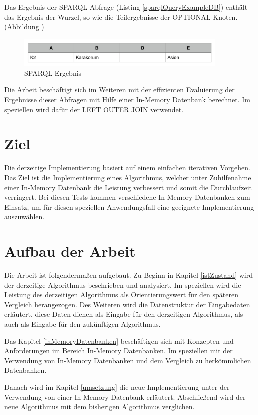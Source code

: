 \documentclass[draft,final]{vutinfth} %
\begin{document}
Das Ergebnis der SPARQL Abfrage (Listing \ref{sparqlQueryExampleDB}) enthält das Ergebnis der Wurzel, so wie die Teilergebnisse der OPTIONAL Knoten. (Abbildung )

\begin{figure}[ht]
	\centering
	\includegraphics[width=0.9\textwidth]{sparqlErgebnis}
	\caption{SPARQL Ergebnis}
	\label{sparqlErgebnis}
\end{figure}

Die Arbeit beschäftigt sich im Weiteren mit der effizienten Evaluierung der Ergebnisse dieser Abfragen mit Hilfe einer In-Memory Datenbank berechnet. Im speziellen wird dafür der LEFT OUTER JOIN verwendet.

\section*{Ziel}
Die derzeitige Implementierung basiert auf einem einfachen iterativen Vorgehen. Das Ziel ist die Implementierung eines Algorithmus, welcher unter Zuhilfenahme einer In-Memory Datenbank die Leistung verbessert und somit die Durchlaufzeit verringert. Bei diesen Tests kommen verschiedene In-Memory Datenbanken zum Einsatz, um für diesen speziellen Anwendungsfall eine geeignete Implementierung auszuwählen.

\section*{Aufbau der Arbeit}
Die Arbeit ist folgenderma{\ss}en aufgebaut. Zu Beginn in Kapitel \ref{istZustand} wird der derzeitige Algorithmus beschrieben und analysiert. Im speziellen wird die Leistung des derzeitigen Algorithmus als Orientierungswert für den späteren Vergleich herangezogen. Des Weiteren wird die Datenstruktur der Eingabedaten erläutert, diese Daten dienen als Eingabe für den derzeitigen Algorithmus, als auch als Eingabe für den zukünftigen Algorithmus.

Das Kapitel \ref{inMemoryDatenbanken} beschäftigen sich mit Konzepten und Anforderungen im Bereich In-Memory Datenbanken. Im speziellen mit der Verwendung von In-Memory Datenbanken und dem Vergleich zu herkömmlichen Datenbanken.

Danach wird im Kapitel \ref{umsetzung} die neue Implementierung unter der Verwendung von einer In-Memory Datenbank erläutert. Abschlie{\ss}end wird der neue Algorithmus mit dem bisherigen Algorithmus verglichen.
\end{document}
